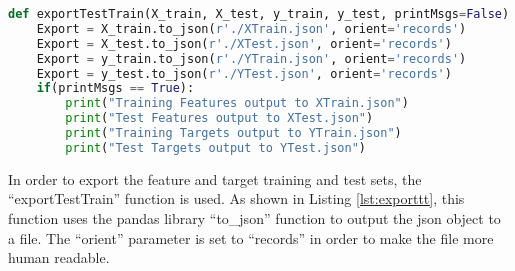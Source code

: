 \begin{lstlisting}[language=Python, caption={``exportTestTrain'' function},
label={lst:exporttt}]
def exportTestTrain(X_train, X_test, y_train, y_test, printMsgs=False):
	Export = X_train.to_json(r'./XTrain.json', orient='records')
	Export = X_test.to_json(r'./XTest.json', orient='records')
	Export = y_train.to_json(r'./YTrain.json', orient='records')
	Export = y_test.to_json(r'./YTest.json', orient='records')
	if(printMsgs == True):
		print("Training Features output to XTrain.json")
		print("Test Features output to XTest.json")
		print("Training Targets output to YTrain.json")
		print("Test Targets output to YTest.json")
\end{lstlisting}

In order to export the feature and target training and test sets, the
``exportTestTrain'' function is used. As shown in Listing \ref{lst:exporttt},
this function uses the pandas library ``to\_json'' function to output the json
object to a file. The ``orient'' parameter is set to ``records'' in order to
make the file more human readable.

